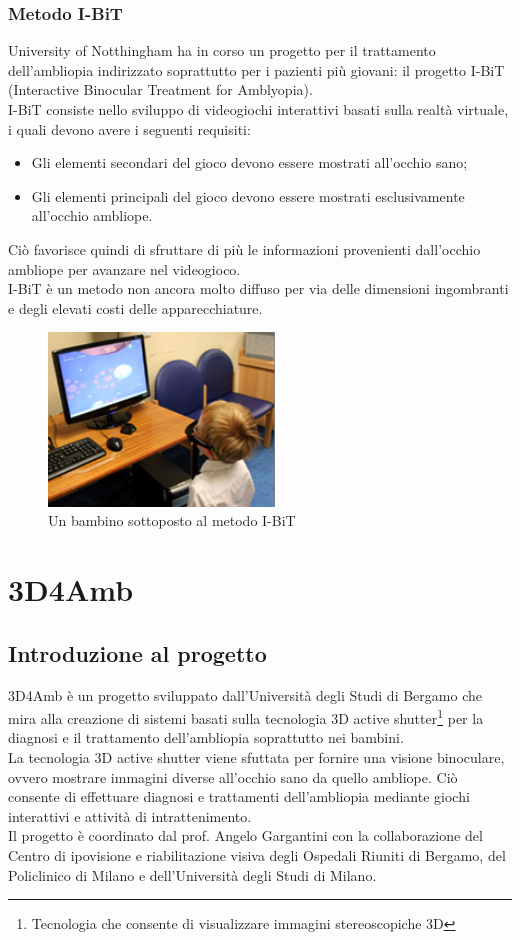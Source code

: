 \documentclass[12pt,a4paper,openright,twoside]{book}
\begin{document}
    \subsection{Metodo I-BiT}
    University of Notthingham ha in corso un progetto per il trattamento dell'ambliopia indirizzato soprattutto per i pazienti più giovani: il progetto I-BiT (Interactive Binocular Treatment for Amblyopia).\\
    I-BiT consiste nello sviluppo di videogiochi interattivi basati sulla realtà virtuale, i quali devono avere i seguenti requisiti: 
    \begin{itemize}
    	\item Gli elementi secondari del gioco devono essere mostrati all'occhio sano;
    	\item Gli elementi principali del gioco devono essere mostrati esclusivamente all'occhio ambliope.
    \end{itemize}
	Ciò favorisce quindi di sfruttare di più le informazioni provenienti dall'occhio ambliope per avanzare nel videogioco.\\
	I-BiT è un metodo non ancora molto diffuso per via delle dimensioni ingombranti e degli elevati costi delle apparecchiature.
     \begin{figure}[h]
    	\centering   	
    	\includegraphics[width=60mm]{i-bit.jpg}
    	\caption{Un bambino sottoposto al metodo I-BiT}
    	\label{fig:ibit}
    \end{figure}
    \chapter{3D4Amb}
    \section{Introduzione al progetto}
    3D4Amb è un progetto sviluppato dall'Università degli Studi di Bergamo che mira alla creazione di sistemi basati sulla tecnologia 3D active shutter\footnote{Tecnologia che consente di visualizzare immagini stereoscopiche 3D} per la diagnosi e il trattamento dell'ambliopia soprattutto nei bambini.\\
    La tecnologia 3D active shutter viene sfuttata per fornire una visione binoculare, ovvero mostrare immagini diverse all'occhio sano da quello ambliope. Ciò consente di effettuare diagnosi e trattamenti dell'ambliopia mediante giochi interattivi e attività di intrattenimento.\\
    Il progetto è coordinato dal prof. Angelo Gargantini con la collaborazione del Centro di ipovisione e riabilitazione visiva degli Ospedali Riuniti di Bergamo, del Policlinico di Milano e dell'Università degli Studi di Milano.
    
\end{document}
